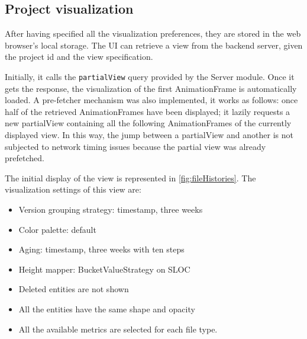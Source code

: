\subsection*{Project visualization}
After having specified all the visualization preferences, they are stored in the web browser's local storage. 
The UI can retrieve a view from the backend server, given the project id and the view specification. 

Initially, it calls the \texttt{partialView} query provided by the Server module. Once it gets the response, the visualization of the first AnimationFrame is automatically loaded. 
A pre-fetcher mechanism was also implemented, it works as follows: once half of the retrieved AnimationFrames have been displayed; it lazily requests a new partialView containing all the following AnimationFrames of the currently displayed view. 
In this way, the jump between a partialView and another is not subjected to network timing issues because the partial view was already prefetched. 


The initial display of the view is represented in \autoref{fig:fileHistories}. The visualization settings of this view are:
\begin{itemize}
    \item Version grouping strategy: timestamp, three weeks
    \item Color palette: default
    \item Aging: timestamp, three weeks with ten steps
    \item Height mapper: BucketValueStrategy on SLOC
    \item Deleted entities are not shown
    \item All the entities have the same shape and opacity
    \item All the available metrics are selected for each file type. 
\end{itemize}

